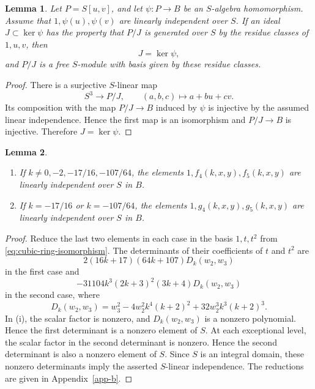 \documentclass[11 pt]{amsart}
\newtheorem{lemma}{Lemma}
\theoremstyle{definition}
\theoremstyle{plain}
\begin{document}
\begin{lemma}\label{lem:kernel-criterion}
Let $P=S[u,v]$, and let $\psi:P\to B$ be an $S$-algebra homomorphism.
Assume that $1,\psi(u),\psi(v)$ are linearly independent over $S$.
If an ideal $J\subset\ker\psi$ has the property that $P/J$ is generated
over $S$ by the residue classes of $1,u,v$, then
\[
  J=\ker\psi,
\]
and $P/J$ is a free $S$-module with basis given by these residue
classes.
\end{lemma}

\begin{proof}
There is a surjective $S$-linear map
\[
S^3\longrightarrow P/J,\qquad
(a,b,c)\longmapsto a+bu+cv.
\]
Its composition with the map $P/J\to B$ induced by $\psi$ is injective
by the assumed linear independence.  Hence the first map is an
isomorphism and $P/J\to B$ is injective.  Therefore $J=\ker\psi$.
\end{proof}

\begin{lemma}\label{lem:character-value-independence}
\begin{enumerate}[label=\textup{(\roman*)}]
\item If $k\neq0,-2,-17/16,-107/64$, the elements
$1,f_4(k,x,y),f_5(k,x,y)$
are linearly independent over $S$ in $B$.
\item If $k=-17/16$ or $k=-107/64$, the elements
$1,g_4(k,x,y),g_5(k,x,y)$
are linearly independent over $S$ in $B$.
\end{enumerate}
\end{lemma}

\begin{proof}
Reduce the last two elements in each case in the basis $1,t,t^2$ from
\eqref{eq:cubic-ring-isomorphism}. The determinants of their
coefficients of $t$ and $t^2$ are
\[
2(16k+17)(64k+107)D_k(w_2,w_3)
\]
in the first case and
\[
-31104k^3(2k+3)^2(3k+4)D_k(w_2,w_3)
\]
in the second case, where
\[
D_k(w_2,w_3)=w_3^2-4w_2^2k^4(k+2)^2
+32w_2^3k^3(k+2)^3.
\]
In \textup{(i)}, the scalar factor is nonzero, and
$D_k(w_2,w_3)$ is a nonzero polynomial. Hence the first determinant is
a nonzero element of $S$. At each exceptional level, the scalar factor
in the second determinant is nonzero. Hence the second determinant is
also a nonzero element of $S$. Since $S$ is an integral domain, these
nonzero determinants imply the asserted $S$-linear independence. The
reductions are given in
Appendix~\ref{app-b}.
\end{proof}
\end{document}
